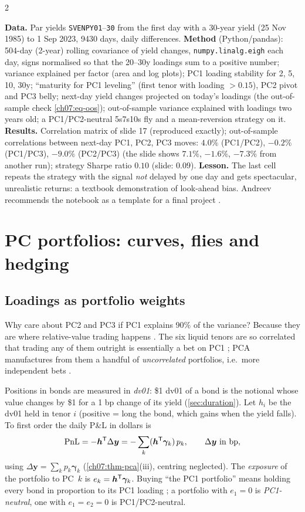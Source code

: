 \begin{paracol}{2}
\begin{casestudy}
\textbf{Data.} Par yields \texttt{SVENPY01}--\texttt{30} from the first day with a 30-year yield (25 Nov 1985) to
1 Sep 2023, 9430 days, daily differences. \textbf{Method} (Python/pandas): 504-day (2-year) rolling covariance of
yield changes, \texttt{numpy.linalg.eigh} each day, signs normalised so that the 20--30y loadings sum to a
positive number; variance explained per factor (area and log plots); PC1 loading stability for 2, 5, 10, 30y;
``maturity for PC1 leveling'' (first tenor with loading $>0.15$), PC2 pivot and PC3 belly; next-day yield changes
projected on today's loadings (the out-of-sample check \eqref{ch07:eq-oos}); out-of-sample variance explained with
loadings two years old; a PC1/PC2-neutral 5s7s10s fly and a mean-reversion strategy on it.
\textbf{Results.} Correlation matrix of slide 17 (reproduced exactly); out-of-sample correlations between
next-day PC1, PC2, PC3 moves: $4.0\%$ (PC1/PC2), $-0.2\%$ (PC1/PC3), $-9.0\%$ (PC2/PC3) (the slide shows
$7.1\%$, $-1.6\%$, $-7.3\%$ from another run); strategy Sharpe ratio $0.10$ (slide: $0.09$).
\textbf{Lesson.} The last cell repeats the strategy with the signal \emph{not} delayed by one day and gets
spectacular, unrealistic returns: a textbook demonstration of look-ahead bias. Andreev recommends the
notebook as a template for a final project .
\end{casestudy}

\section{PC portfolios: curves, flies and hedging}\label{ch07:sec-pcport}

\subsection{Loadings as portfolio weights}
Why care about PC2 and PC3 if PC1 explains 90\% of the variance? Because they are where relative-value
trading happens . The six liquid tenors are so correlated that trading any of them outright
is essentially a bet on PC1 ; PCA manufactures from them a handful of \emph{uncorrelated}
portfolios, i.e.\ more independent bets .

Positions in bonds are measured in \emph{dv01}: \$1 dv01 of a bond is the notional whose value changes by
\$1 for a 1 bp change of its yield (\cref{sec:duration}). Let $h_i$ be the dv01 held in tenor $i$ (positive =
long the bond, which gains when the yield falls). To first order the daily P\&L in dollars is
\[
  \mathrm{PnL}=-\bm h^{\mathsf T}\Delta\bm y=-\sum_k(\bm h^{\mathsf T}\bm\gamma_k)\,p_k,\qquad \Delta\bm y\ \text{in bp},
\]
using $\Delta\bm y=\sum_kp_k\bm\gamma_k$ (\cref{ch07:thm-pca}(iii), centring neglected). The \emph{exposure} of the portfolio to
PC~$k$ is $e_k=\bm h^{\mathsf T}\bm\gamma_k$. Buying ``the PC1 portfolio'' means holding every bond in proportion to its PC1
loading ; a portfolio with $e_1=0$ is \emph{PC1-neutral}, one with $e_1=e_2=0$ is PC1/PC2-neutral.


\end{paracol}
